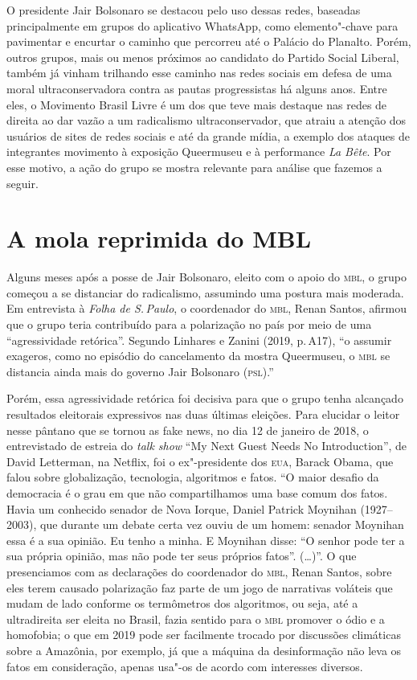 O presidente Jair Bolsonaro se destacou pelo uso dessas redes, baseadas
principalmente em grupos do aplicativo WhatsApp, como elemento"-chave
para pavimentar e encurtar o caminho que percorreu até o Palácio do
Planalto. Porém, outros grupos, mais ou menos próximos ao candidato do
Partido Social Liberal, também já vinham trilhando esse caminho nas
redes sociais em defesa de uma moral ultraconservadora contra as pautas
progressistas há alguns anos. Entre eles, o Movimento Brasil Livre é um
dos que teve mais destaque nas redes de direita ao dar vazão a um
radicalismo ultraconservador, que atraiu a atenção dos usuários de sites
de redes sociais e até da grande mídia, a exemplo dos ataques de
integrantes movimento à exposição Queermuseu e à performance \textit{La Bête}.
Por esse motivo, a ação do grupo se mostra relevante para análise que
fazemos a seguir.

\section{A mola reprimida do MBL}

Alguns meses após a posse de Jair Bolsonaro, eleito com o apoio do \textsc{mbl},
o grupo começou a se distanciar do radicalismo, assumindo uma postura
mais moderada. Em entrevista à \textit{Folha de S.\,Paulo}, o coordenador
do \textsc{mbl}, Renan Santos, afirmou que o grupo teria contribuído para a
polarização no país por meio de uma ``agressividade retórica''. Segundo
Linhares e Zanini (2019, p.\,A17), ``o assumir exageros, como no episódio
do cancelamento da mostra Queermuseu, o \textsc{mbl} se distancia ainda mais do
governo Jair Bolsonaro (\textsc{psl}).''

Porém, essa agressividade retórica foi decisiva para que o grupo tenha
alcançado resultados eleitorais expressivos nas duas últimas eleições.
Para elucidar o leitor nesse pântano que se tornou as fake news, no dia
12 de janeiro de 2018, o entrevistado de estreia do \textit{talk show} ``My Next
Guest Needs No Introduction'', de David Letterman, na Netflix, foi o
ex"-presidente dos \textsc{eua}, Barack Obama, que falou sobre globalização,
tecnologia, algoritmos e fatos. ``O maior desafio da democracia é o grau
em que não compartilhamos uma base comum dos fatos. Havia um conhecido
senador de Nova Iorque, Daniel Patrick Moynihan (1927--2003), que durante
um debate certa vez ouviu de um homem: senador Moynihan essa é a sua
opinião. Eu tenho a minha. E Moynihan disse: ``O senhor pode ter a sua
própria opinião, mas não pode ter seus próprios fatos''. (\ldots{})''. O que
presenciamos com as declarações do coordenador do \textsc{mbl}, Renan Santos,
sobre eles terem causado polarização faz parte de um jogo de narrativas
voláteis que mudam de lado conforme os termômetros dos algoritmos, ou
seja, até a ultradireita ser eleita no Brasil, fazia sentido para o \textsc{mbl}
promover o ódio e a homofobia; o que em 2019 pode ser facilmente trocado
por discussões climáticas sobre a Amazônia, por exemplo, já que a
máquina da desinformação não leva os fatos em consideração, apenas
usa"-os de acordo com interesses diversos.

